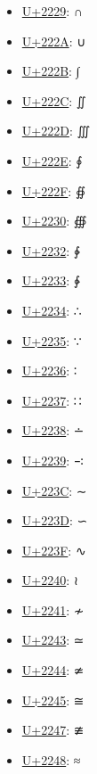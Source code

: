 \begin{itemize}
	\item \href{https://decodeunicode.org/en/u+2229}{U+2229}: ∩
	\item \href{https://decodeunicode.org/en/u+222A}{U+222A}: ∪
	\item \href{https://decodeunicode.org/en/u+222B}{U+222B}: ∫
	\item \href{https://decodeunicode.org/en/u+222C}{U+222C}: ∬
	\item \href{https://decodeunicode.org/en/u+222D}{U+222D}: ∭
	\item \href{https://decodeunicode.org/en/u+222E}{U+222E}: ∮
	\item \href{https://decodeunicode.org/en/u+222F}{U+222F}: ∯
	\item \href{https://decodeunicode.org/en/u+2230}{U+2230}: ∰
	\item \href{https://decodeunicode.org/en/u+2232}{U+2232}: ∲
	\item \href{https://decodeunicode.org/en/u+2233}{U+2233}: ∳
	\item \href{https://decodeunicode.org/en/u+2234}{U+2234}: ∴
	\item \href{https://decodeunicode.org/en/u+2235}{U+2235}: ∵
	\item \href{https://decodeunicode.org/en/u+2236}{U+2236}: ∶
	\item \href{https://decodeunicode.org/en/u+2237}{U+2237}: ∷
	\item \href{https://decodeunicode.org/en/u+2238}{U+2238}: ∸
	\item \href{https://decodeunicode.org/en/u+2239}{U+2239}: ∹
	\item \href{https://decodeunicode.org/en/u+223C}{U+223C}: ∼
	\item \href{https://decodeunicode.org/en/u+223D}{U+223D}: ∽
	\item \href{https://decodeunicode.org/en/u+223F}{U+223F}: ∿
	\item \href{https://decodeunicode.org/en/u+2240}{U+2240}: ≀
	\item \href{https://decodeunicode.org/en/u+2241}{U+2241}: ≁
	\item \href{https://decodeunicode.org/en/u+2243}{U+2243}: ≃
	\item \href{https://decodeunicode.org/en/u+2244}{U+2244}: ≄
	\item \href{https://decodeunicode.org/en/u+2245}{U+2245}: ≅
	\item \href{https://decodeunicode.org/en/u+2247}{U+2247}: ≇
	\item \href{https://decodeunicode.org/en/u+2248}{U+2248}: ≈

\end{itemize}
